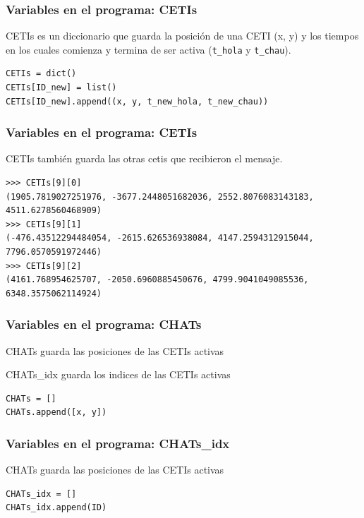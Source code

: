 \documentclass[handout]{beamer}
\theoremstyle{plain}
\theoremstyle{definition}
\theoremstyle{remark}
\begin{document}
\begin{frame}[fragile]
\frametitle{Variables en el programa: CETIs}

CETIs es un diccionario que guarda la posición de una CETI (x, y) y los
tiempos en los cuales comienza y termina de ser activa
(\texttt{t\_hola} y \texttt{t\_chau}).

\begin{lstlisting}
CETIs = dict()
CETIs[ID_new] = list()
CETIs[ID_new].append((x, y, t_new_hola, t_new_chau))
\end{lstlisting}

\end{frame}           
 

\begin{frame}[fragile]
\frametitle{Variables en el programa: CETIs}

CETIs tambi\'en guarda las otras cetis que recibieron el mensaje.


\begin{lstlisting}
>>> CETIs[9][0]
(1905.7819027251976, -3677.2448051682036, 2552.8076083143183, 4511.6278560468909)
>>> CETIs[9][1]
(-476.43512294484054, -2615.626536938084, 4147.2594312915044, 7796.0570591972446)
>>> CETIs[9][2]
(4161.768954625707, -2050.6960885450676, 4799.9041049085536, 6348.3575062114924)

\end{lstlisting}

\end{frame}           

 


\begin{frame}[fragile]
\frametitle{Variables en el programa: CHATs}

CHATs guarda las posiciones de las CETIs activas


CHATs\_idx guarda los indices de las CETIs activas

\begin{lstlisting}
CHATs = []
CHATs.append([x, y])
\end{lstlisting}

\end{frame}           

 
\begin{frame}[fragile]
\frametitle{Variables en el programa: CHATs\_idx}

CHATs guarda las posiciones de las CETIs activas

\begin{lstlisting}
CHATs_idx = []
CHATs_idx.append(ID)
\end{lstlisting}

\end{frame}           
 
\end{document}
